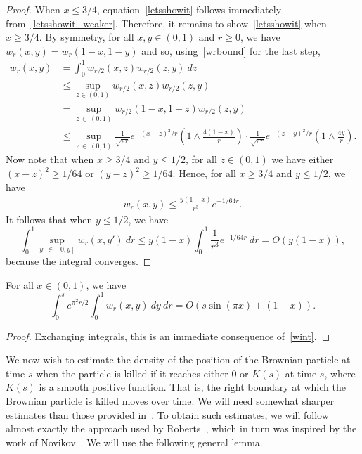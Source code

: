 \documentclass[AHL,Unicode,longabstracts,published]{cedram}
\newcommand{\1} {\mathds{1}}
\begin{document}
\begin{proof}
When $x \leq 3/4$, equation~\eqref{letsshowit} follows immediately from~\eqref{letsshowit_weaker}. Therefore, it remains to show~\eqref{letsshowit} when $x \geq 3/4$. By symmetry, for all $x,y \in (0,1)$ and $r\ge0$, we have $w_r(x,y) = w_r(1-x, 1-y)$ and so, using~\eqref{wrbound} for the last step,
\begin{align*}
w_r(x,y) &= \int_0^1 w_{r/2}(x,z) w_{r/2}(z,y) \: dz \\
&\leq \sup_{z \in (0,1)} w_{r/2}(x,z) w_{r/2}(z,y) \\
&= \sup_{z\,\in\,(0,1)} w_{r/2}(1-x, 1-z) w_{r/2}(z,y) \\
&\leq \sup_{z\,\in\,(0,1)} \frac{1}{\sqrt{\pi r}} e^{-(x-z)^2/r} \left(1 \wedge \frac{4(1-x)}{r} \right) \cdot \frac{1}{\sqrt{\pi r}} e^{-(z-y)^2/r} \left(1 \wedge \frac{4y}{r} \right).
\end{align*}
Now note that when $x \geq 3/4$ and $y \leq 1/2$, for all $z \in (0,1)$ we have either $(x-z)^2 \geq 1/64$ or $(y-z)^2 \geq 1/64$. Hence, for all $x \geq 3/4$ and $y \leq 1/2$, we have
\begin{align*}
w_r(x,y) \leq \frac{y(1-x)}{r^3} e^{-1/64r}.
\end{align*}
It follows that when $y \leq 1/2$, we have
\[
\int_0^1 \sup_{y'\,\in\,[0, y]} w_r(x,y') \: dr \leq y(1-x) \int_0^1 \frac{1}{r^3} e^{-1/64r} \: dr = O(y(1-x)),
\]
because the integral converges.
\end{proof}

\begin{lemm}\label{wint2}
For all $x \in (0,1)$, we have
\[
\int_0^s e^{\pi^2 r/2} \int_0^1 w_r(x,y) \: dy \: dr = O(s \sin(\pi x) + (1-x)).
\]
\end{lemm}

\begin{proof}
Exchanging integrals, this is an immediate consequence of~\eqref{wint}.
\end{proof}

We now wish to estimate the density of the position of the Brownian particle at time $s$ when the particle is killed if it reaches either $0$ or $K(s)$ at time $s$, where $K(s)$ is a smooth positive function. That is, the right boundary at which the Brownian particle is killed moves over time. We will need somewhat sharper estimates than those provided in~\cite{bbs}. To obtain such estimates, we will follow almost exactly the approach used by Roberts~\cite{roberts}, which in turn was inspired by the work of Novikov~\cite{nov}. We will use the following general lemma.
\end{document}
